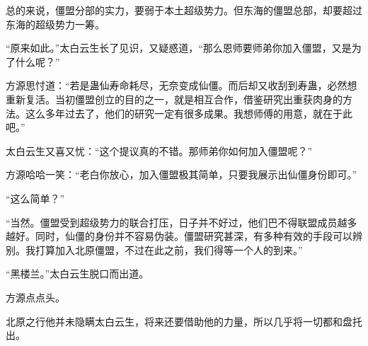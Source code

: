 \begin{this_body}
总的来说，僵盟分部的实力，要弱于本土超级势力。但东海的僵盟总部，却要超过东海的超级势力一筹。

“原来如此。”太白云生长了见识，又疑惑道，“那么恩师要师弟你加入僵盟，又是为了什么呢？”

方源思忖道：“若是蛊仙寿命耗尽，无奈变成仙僵。而后却又收刮到寿蛊，必然想重新复活。当初僵盟创立的目的之一，就是相互合作，借鉴研究出重获肉身的方法。这么多年过去了，他们的研究一定有很多成果。我想师傅的用意，就在于此吧。”

太白云生又喜又忧：“这个提议真的不错。那师弟你如何加入僵盟呢？”

方源哈哈一笑：“老白你放心，加入僵盟极其简单，只要我展示出仙僵身份即可。”

“这么简单？”

“当然。僵盟受到超级势力的联合打压，日子并不好过，他们巴不得联盟成员越多越好。同时，仙僵的身份并不容易伪装。僵盟研究甚深，有多种有效的手段可以辨别。我打算加入北原僵盟，不过在此之前，我们得等一个人的到来。”

“黑楼兰。”太白云生脱口而出道。

方源点点头。

北原之行他并未隐瞒太白云生，将来还要借助他的力量，所以几乎将一切都和盘托出。

\end{this_body}

